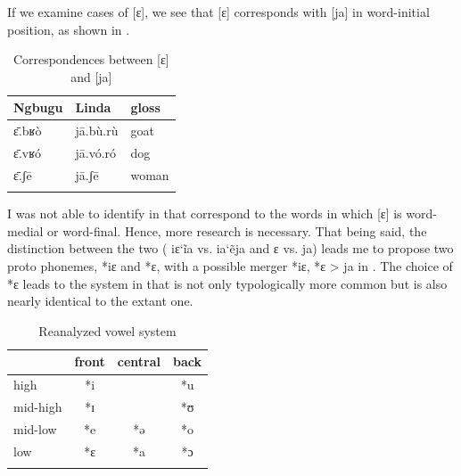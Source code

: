 \documentclass[output=paper,colorlinks,citecolor=brown]{langscibook}
\begin{document}
If we examine cases of [ɛ], we see that  [ɛ] corresponds with  [ja] \citep{Moñino1988} in word-initial position, as shown in .

\begin{table}
\caption{Correspondences between  [ɛ] and  [ja]\label{tab:olson:13}}
    \begin{tabular}{lll}
    \lsptoprule
        Ngbugu & Linda & gloss\\
    \midrule
        ɛ̄.bʁò       & jā.bù.rù  & goat\\
        ɛ̄.vʁó       & jā.vó.ró & dog\\
        ɛ̄.ʃē        & jā.ʃē    & woman\\
    \lspbottomrule
 \end{tabular}
\end{table}

I was not able to identify  in  that correspond to the  words in which [ɛ] is word-medial or word-final. Hence, more research is necessary. That being said, the distinction between the two  ( iɛ\char`\~ia vs.  ia\char`\~eja and  ɛ vs.  ja) leads me to propose two proto phonemes, *iɛ and *ɛ, with a possible merger *iɛ, *ɛ > ja in . The choice of *ɛ leads to the  system in  that is not only typologically  more common but is also nearly identical to the extant  one.

\begin{table}
\caption{Reanalyzed  vowel system}
\label{tab:olson:14}
 \begin{tabular}{lccc}
    \lsptoprule
                    & front & central   & back\\
    \midrule
        high        & *i    &           & *u\\
        mid-high    & *ɪ    &           & *ʊ\\
        mid-low     & *e    & *ə        & *o\\
        low         & *ɛ    & *a        & *ɔ\\
    \lspbottomrule
    \end{tabular}
\end{table}
\end{document}
